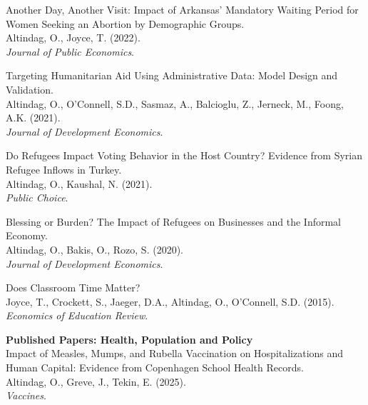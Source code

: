 \documentclass[12pt]{article}
\newcommand{\papertitle}[1]{#1} %
\begin{document}
\smallskip
\noindent\begin{minipage}{\linewidth}
\papertitle{Another Day, Another Visit: Impact of Arkansas' Mandatory Waiting Period for Women Seeking an Abortion by Demographic Groups.} \\
Altindag, O., Joyce, T. (2022). \\
\textit{Journal of Public Economics}.
\end{minipage}

\smallskip
\noindent\begin{minipage}{\linewidth}
\papertitle{Targeting Humanitarian Aid Using Administrative Data: Model Design and Validation.} \\
Altindag, O., O'Connell, S.D., Sasmaz, A., Balcioglu, Z., Jerneck, M., Foong, A.K. (2021). \\
\textit{Journal of Development Economics}.
\end{minipage}

\smallskip
\noindent\begin{minipage}{\linewidth}
\papertitle{Do Refugees Impact Voting Behavior in the Host Country? Evidence from Syrian Refugee Inflows in Turkey.} \\
Altindag, O., Kaushal, N. (2021). \\
\textit{Public Choice}.
\end{minipage}

\smallskip
\noindent\begin{minipage}{\linewidth}
\papertitle{Blessing or Burden? The Impact of Refugees on Businesses and the Informal Economy.} \\
Altindag, O., Bakis, O., Rozo, S. (2020). \\
\textit{Journal of Development Economics}.
\end{minipage}

\smallskip
\noindent\begin{minipage}{\linewidth}
\papertitle{Does Classroom Time Matter?} \\
Joyce, T., Crockett, S., Jaeger, D.A., Altindag, O., O'Connell, S.D. (2015). \\
\textit{Economics of Education Review}.
\end{minipage}

\vspace{0.5em}

\noindent\begin{minipage}{\linewidth}
\textbf{Published Papers: Health, Population and Policy}\\[5pt]
\papertitle{Impact of Measles, Mumps, and Rubella Vaccination on Hospitalizations and Human Capital: Evidence from Copenhagen School Health Records.} \\
Altindag, O., Greve, J., Tekin, E. (2025). \\
\textit{Vaccines}.
\end{minipage}
\end{document}
